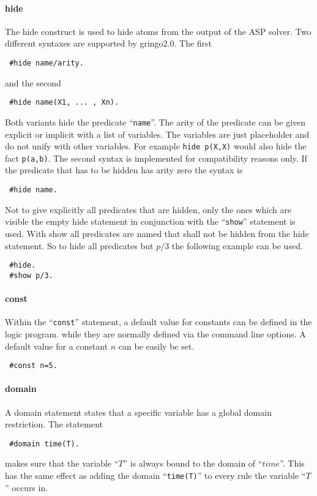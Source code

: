 \documentclass[a4paper,10pt]{article}
\begin{document}
\paragraph{hide}
The hide construct is used to hide atoms from the output of the ASP solver.
Two different syntaxes are supported by gringo2.0.
The first 
\begin{verbatim}
 #hide name/arity.
\end{verbatim}
and the second
\begin{verbatim}
 #hide name(X1, ... , Xn).
\end{verbatim}
Both variants hide the predicate ``\texttt{name}''.
The arity of the predicate can be given explicit or implicit with a list of variables.
The variables are just placeholder and do not unify with other variables. For example \texttt{hide p(X,X)} would also hide the fact \texttt{p(a,b)}. The second syntax is implemented for compatibility reasons only.
If the predicate that has to be hidden has arity zero the syntax is
\begin{verbatim}
 #hide name.
\end{verbatim}
Not to give explicitly all predicates that are hidden, only the ones which are visible the empty hide statement
in conjunction with the ``\texttt{show}'' statement is used.
With show all predicates are named that shall not be hidden from the hide statement.
So to hide all predicates but $p/3$ the following example can be used.
\begin{verbatim}
 #hide.
 #show p/3.
\end{verbatim}

\paragraph{const}
Within the ``\texttt{const}'' statement, a default value for constants can be defined in the logic program.
while they are normally defined via the command line options.
A default value for a constant $n$ can be easily be set.
\begin{verbatim}
 #const n=5.
\end{verbatim}
\paragraph{domain}
A domain statement states that a specific variable has a global domain restriction.
The statement
\begin{verbatim}
 #domain time(T).
\end{verbatim}
makes sure that the variable ``$T$'' is always bound to the domain of ``$time$''.
This has the same effect as adding the domain ``\texttt{time(T)}'' to every rule the variable ``$T$'' occurs in.
\end{document}
